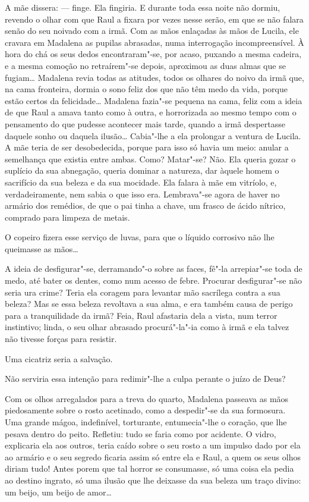 A mãe dissera: --- finge. Ela fingiria. E durante toda essa noite não
dormiu, revendo o olhar com que Raul a fixara por vezes nesse serão, em
que se não falara senão do seu noivado com a irmã. Com as mãos enlaçadas
às mãos de Lucila, ele cravara em Madalena as pupilas abrasadas, numa
interrogação incompreensível. À hora do chá os seus dedos
encontraram"-se, por acaso, puxando a mesma cadeira, e a mesma comoção no
retraírem"-se depois, aproximou as duas almas que se fugiam\ldots{} Madalena
revia todas as atitudes, todos os olhares do noivo da irmã que, na cama
fronteira, dormia o sono feliz dos que não têm medo da vida, porque
estão certos da felicidade\ldots{} Madalena fazia"-se pequena na cama, feliz
com a ideia de que Raul a amava tanto como à outra, e horrorizada ao
mesmo tempo com o pensamento do que pudesse acontecer mais tarde, quando
a irmã despertasse daquele sonho ou daquela ilusão\ldots{} Cabia"-lhe a ela
prolongar a ventura de Lucila. A mãe teria de ser desobedecida, porque
para isso só havia um meio: anular a semelhança que existia entre ambas.
Como? Matar"-se? Não. Ela queria gozar o suplício da sua abnegação,
queria dominar a natureza, dar àquele homem o sacrifício da sua beleza e
da sua mocidade. Ela falara à mãe em vitríolo, e, verdadeiramente, nem
sabia o que isso era. Lembrava"-se agora de haver no armário dos
remédios, de que o pai tinha a chave, um frasco de ácido nítrico,
comprado para limpeza de metais.

O copeiro fizera esse serviço de luvas, para que o líquido corrosivo não
lhe queimasse as mãos\ldots{}

A ideia de desfigurar"-se, derramando"-o sobre as faces, fê"-la arrepiar"-se
toda de medo, até bater os dentes, como num acesso de febre. Procurar
desfigurar"-se não seria ura crime? Teria ela coragem para levantar mão
sacrílega contra a sua beleza? Mas se essa beleza revoltava a sua alma,
e era também causa de perigo para a tranquilidade da irmã? Feia, Raul
afastaria dela a vista, num terror instintivo; linda, o seu olhar
abrasado procurá"-la"-ia como à irmã e ela talvez não tivesse forças para
resistir.

Uma cicatriz seria a salvação.

Não serviria essa intenção para redimir"-lhe a culpa perante o juízo de
Deus?

Com os olhos arregalados para a treva do quarto, Madalena passeava as
mãos piedosamente sobre o rosto acetinado, como a despedir"-se da sua
formosura. Uma grande mágoa, indefinível, torturante, entumecia"-lhe o
coração, que lhe pesava dentro do peito. Refletiu: tudo se faria como
por acidente. O vidro, explicaria ela aos outros, teria caído sobre o
seu rosto a um impulso dado por ela ao armário e o seu segredo ficaria
assim só entre ela e Raul, a quem os seus olhos diriam tudo! Antes porem
que tal horror se consumasse, só uma coisa ela pedia ao destino ingrato,
só uma ilusão que lhe deixasse da sua beleza um traço divino: um beijo,
um beijo de amor\ldots{}

